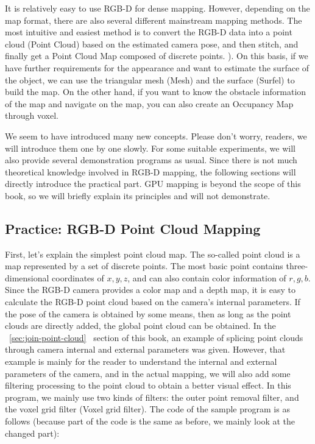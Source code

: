 It is relatively easy to use RGB-D for dense mapping. However, depending on the map format, there are also several different mainstream mapping methods. The most intuitive and easiest method is to convert the RGB-D data into a point cloud (Point Cloud) based on the estimated camera pose, and then stitch, and finally get a Point Cloud Map composed of discrete points. ). On this basis, if we have further requirements for the appearance and want to estimate the surface of the object, we can use the triangular mesh (Mesh) and the surface (Surfel) to build the map. On the other hand, if you want to know the obstacle information of the map and navigate on the map, you can also create an Occupancy Map through voxel.

We seem to have introduced many new concepts. Please don't worry, readers, we will introduce them one by one slowly. For some suitable experiments, we will also provide several demonstration programs as usual. Since there is not much theoretical knowledge involved in RGB-D mapping, the following sections will directly introduce the practical part. GPU mapping is beyond the scope of this book, so we will briefly explain its principles and will not demonstrate.

\subsection{Practice: RGB-D Point Cloud Mapping}
First, let's explain the simplest point cloud map. The so-called point cloud is a map represented by a set of discrete points. The most basic point contains three-dimensional coordinates of $x, y, z$, and can also contain color information of $r, g, b$. Since the RGB-D camera provides a color map and a depth map, it is easy to calculate the RGB-D point cloud based on the camera's internal parameters. If the pose of the camera is obtained by some means, then as long as the point clouds are directly added, the global point cloud can be obtained. In the ~\ref{sec:join-point-cloud}~ section of this book, an example of splicing point clouds through camera internal and external parameters was given. However, that example is mainly for the reader to understand the internal and external parameters of the camera, and in the actual mapping, we will also add some filtering processing to the point cloud to obtain a better visual effect. In this program, we mainly use two kinds of filters: the outer point removal filter, and the voxel grid filter (Voxel grid filter). The code of the sample program is as follows (because part of the code is the same as before, we mainly look at the changed part):

